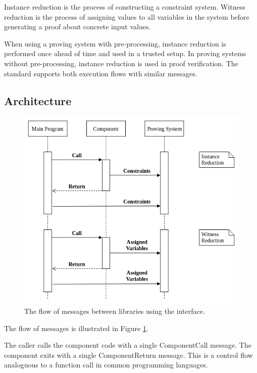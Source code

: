 
	Instance reduction is the process of constructing a constraint system.
	Witness reduction is the process of assigning values to all variables
	in the system before generating a proof about concrete input values.

	When using a proving system with pre-processing, instance reduction
	is performed once ahead of time and used in a trusted setup.
	In proving systems without pre-processing, instance reduction is used in proof verification.
	The standard supports both execution flows with similar messages.

\subsection{Architecture}

\begin{figure}[!h]
	\centering
	\includegraphics[width=\linewidth]{graphics/call_flow.png}
	\caption{The flow of messages between libraries using the interface.}
	\label{flow}
\end{figure}


	The flow of messages is illustrated in Figure \ref{flow}.

	The caller calls the component code with a single \textsf{ComponentCall} message.
	The component exits with a single ComponentReturn message.
	This is a control flow analoguous to a function call in common programming languages.

